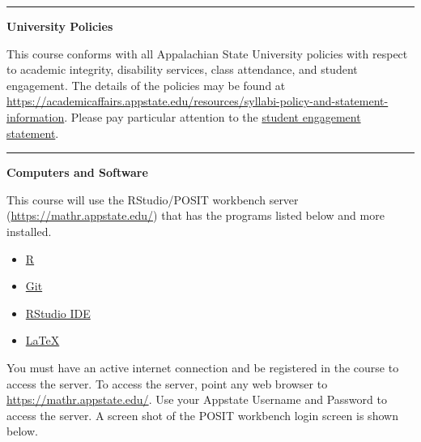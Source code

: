 \documentclass[
]{article}
\providecommand{\tightlist}{%
  \setlength{\itemsep}{0pt}\setlength{\parskip}{0pt}}
\begin{document}
\begin{center}\rule{0.5\linewidth}{0.5pt}\end{center}

\textbf{University Policies}

This course conforms with all Appalachian State University policies with
respect to academic integrity, disability services, class attendance,
and student engagement. The details of the policies may be found at
\url{https://academicaffairs.appstate.edu/resources/syllabi-policy-and-statement-information}.
Please pay particular attention to the
\href{https://academicaffairs.appstate.edu/sites/academicaffairs.appstate.edu/files/gerber_resolution_student_workload_removed_approved_statement_per_mmccoughy_and_sedwards.pdf}{student
engagement statement}.

\begin{center}\rule{0.5\linewidth}{0.5pt}\end{center}

\textbf{Computers and Software}

This course will use the RStudio/POSIT workbench server
(\url{https://mathr.appstate.edu/}) that has the programs listed below
and more installed.

\begin{itemize}
\tightlist
\item
  \href{https://cran.r-project.org}{R}
\item
  \href{https://git-scm.com/downloads}{Git}
\item
  \href{https://posit.co/downloads/}{RStudio IDE}
\item
  \href{https://www.ctan.org/starter}{LaTeX}
\end{itemize}

You must have an active internet connection and be registered in the
course to access the server. To access the server, point any web browser
to \url{https://mathr.appstate.edu/}. Use your Appstate Username and
Password to access the server. A screen shot of the POSIT workbench
login screen is shown below.
\end{document}
